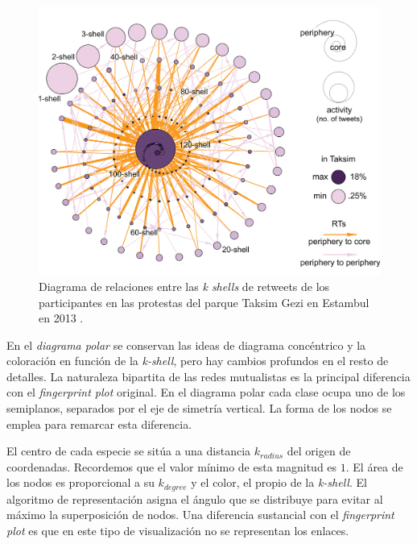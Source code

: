 \begin{figure}[h!]
\centering
\includegraphics[scale=0.6]{Figures/VIS_taksim.png}
\caption{Diagrama de relaciones entre las \textit{k shells} de retweets de los participantes en las protestas del parque Taksim Gezi en Estambul en 2013   \cite{barbera2015critical}.}
\label{fig:VIS_taksim}
\end{figure}


En el \textit{diagrama polar} se conservan las ideas de diagrama concéntrico y la coloración en función de la \textit{k-shell}, pero hay cambios profundos en el resto de detalles. La naturaleza bipartita de las redes mutualistas es la principal diferencia con el \textit{fingerprint plot} original. En el diagrama polar cada clase ocupa uno de los semiplanos, separados por el eje de simetría vertical. La forma de los nodos se emplea para remarcar esta diferencia. 

El centro de cada especie se sitúa a una distancia $k_{radius}$ del origen de coordenadas. Recordemos que el valor mínimo de esta magnitud es $1$. El área de los nodos es proporcional a su $k_{degree}$ y el color, el propio de la \textit{k-shell}. El algoritmo de representación asigna el ángulo que se distribuye para evitar al máximo la superposición de nodos. Una diferencia sustancial con el  \textit{fingerprint plot} es que en este tipo de visualización no se representan los enlaces.

